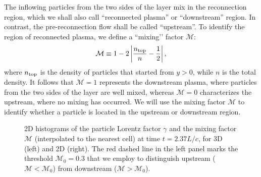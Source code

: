 \documentclass[twocolumn,twocolappendix]{aastex63}
\newcommand{\ls}{\textcolor{teal}}
\begin{document}
The inflowing particles from the two sides of the layer mix in the reconnection region, which we shall also call ``reconnected plasma'' or ``downstream'' region. In contrast, the pre-reconnection flow shall be called ``upstream''.
To identify the region of reconnected plasma, we define a ``mixing’’ factor $\mathcal{M}$:
\begin{equation}
\mathcal{M} \equiv 1-2\left |\frac{n_{\rm top}}{n} - \frac{1}{2} \right |,
\end{equation}
where $n_{\rm top}$ is the density of particles that started from $y>0$, while $n$ is the total density. %
It follows that $\mathcal{M} = 1$ represents the  downstream plasma, where particles from the two sides of the layer are well mixed, whereas $\mathcal{M} = 0$ characterizes the upstream, where no mixing has occurred. We will use the mixing factor $\mathcal{M}$  to identify whether a particle is located in the upstream or downstream region.

\begin{figure*}
    \centering
    \qquad
    \caption{2D histograms of the particle Lorentz factor $\gamma$ and the mixing factor $\mathcal{M}$ (interpolated to the nearest cell) at time $t=2.37L/c$, for 3D (left) and 2D (right). The red dashed line in the left panel marks the threshold $\mathcal{M}_0=0.3$ that we employ to distinguish upstream ($\mathcal{M}<\mathcal{M}_0$) from downstream ($\mathcal{M}>\mathcal{M}_0$). }
    \label{fig:prtl_hist}
\end{figure*}

\end{document}
